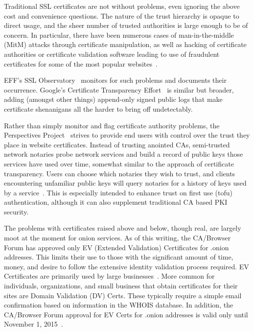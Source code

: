 \documentclass[10pt, conference, compsocconf]{styles/IEEEtran}
\begin{document}
Traditional SSL certificates are not without problems, even ignoring
the above cost and convenience questions. The nature of the trust
hierarchy is opaque to direct usage, and the sheer number of trusted
authorities is large enough to be of concern. In particular, there
have been numerous cases of man-in-the-middle (MitM) attacks through
certificate manipulation, as well as hacking of certificate
authorities or certificate validation software leading to use of
fraudulent certificates for some of the most popular
websites~\cite{forged-ssl-oakland14}.

EFF's SSL Observatory~\cite{ssl-observatory} 
monitors for such problems and documents their occurrence.
Google's Certificate Transparency
Effort~\cite{certificate-transparency} is similar but broader,
adding (amongst other things) append-only signed public
logs that make certificate shenanigans all the harder to bring off
undetectably.

Rather than simply monitor and flag certificate authority
problems, the Perspectives Project~\cite{perspectives} strives to
provide end users with control over the trust they place in website
certificates. Instead of trusting anointed CAs, semi-trusted network
notaries probe network services and build a record of public keys
those services have used over time, somewhat similar to the approach
of certificate transparency. Users can choose which notaries they wish
to trust, and clients encountering unfamiliar public keys will query
notaries for a history of keys used by a
service~\cite{perspectives-paper}. This is especially intended to
enhance trust on first use (tofu) authentication, although it can also
supplement traditional CA based PKI security. 

The problems with certificates raised above and below, though real,
are largely moot at the moment for onion services. As of this writing,
the CA/Browser Forum has approved only EV (Extended Validation)
Certificates for .onion addresses. This limits their use to those with
the significant amount of time, money, and desire to follow the
extensive identity validation process required.  EV Certificates are
primarily used by large businesses~\cite{wikipedia-ev}. More common
for individuals, organizations, and small business that obtain
certificates for their sites are Domain Validation (DV) Certs. These
typically require a simple email confirmation based on information in
the WHOIS database.  In addition, the CA/Browser Forum approval for EV
Certs for .onion addresses is valid only until November 1,
2015~\cite{cab-ballot144}.
\end{document}
